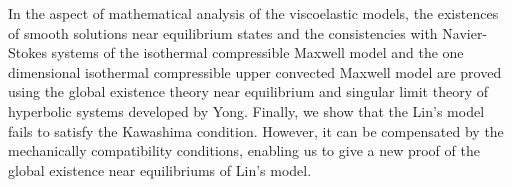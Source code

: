 \begin{eabstract}
  In the aspect of mathematical analysis of the viscoelastic models, the existences of smooth solutions near equilibrium states and the consistencies with Navier-Stokes systems of the isothermal compressible Maxwell model and the one dimensional isothermal compressible upper convected Maxwell model are proved using the global existence theory near equilibrium and singular limit theory of hyperbolic systems developed by Yong. Finally, we show that the Lin's model fails to satisfy the Kawashima condition. However, it can be compensated by the mechanically compatibility conditions, enabling us to give a new proof of the global existence near equilibriums of Lin's model.

  

\end{eabstract}

